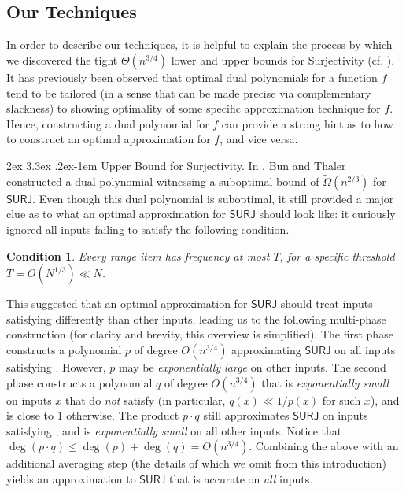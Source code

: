 \documentclass[11pt, letterpaper, fleqn]{article}
\makeatletter
\newcommand{\para}{
  \@startsection{paragraph}{4}
  {\z@}{2ex \@plus 3.3ex \@minus .2ex}{-1em}
  {\normalfont\normalsize\bfseries}
}
\newtheorem{condition}{Condition}
\theoremstyle{plain}
\makeatother
\begin{document}
 

\subsection{Our Techniques}
\label{s:overview}
In order to describe our techniques, it is helpful to explain the process
by which we discovered the tight $\tilde{\Theta}(n^{3/4})$ 
lower and upper bounds for Surjectivity (cf. ).
It has previously been observed \cite{thaler, bt13, adegsurj} that 
optimal dual polynomials for a function $f$
tend to be tailored (in a sense that can be made precise via complementary slackness)
to showing optimality of some specific approximation technique for $f$. Hence, 
constructing a
dual polynomial for $f$ can provide a strong hint as to how to construct an optimal approximation for $f$,
and vice versa.

\para{Upper Bound for Surjectivity.}
In \cite{adegsurj}, Bun and Thaler  constructed a dual polynomial 
witnessing a suboptimal bound of $\tilde{\Omega}(n^{2/3})$ for $\mathsf{SURJ}$. Even though
this dual polynomial is suboptimal, it still provided a major clue as to what an optimal 
approximation for $\mathsf{SURJ}$ should look like: 
 it curiously
 ignored all inputs failing to satisfy the following condition.
\begin{condition} \label{cond}
Every range item has frequency at most $T$, for a specific threshold $T=O(N^{1/3}) \ll N$.
\end{condition}
\noindent This 
suggested that an optimal approximation for $\mathsf{SURJ}$ should treat inputs satisfying    differently than other inputs,
leading us to the following multi-phase construction (for clarity and brevity,
this overview is simplified).
The first phase constructs a polynomial $p$ of degree $O(n^{3/4})$
approximating $\mathsf{SURJ}$ on all inputs satisfying . However, $p$
may be \emph{exponentially large} on other inputs. 
The second phase constructs a polynomial $q$ of degree $O(n^{3/4})$ that is \emph{exponentially small} on inputs $x$ that 
do \emph{not} satisfy  (in particular, $q(x) \ll 1/p(x)$ for such $x$), and is close to 1 otherwise. The product $p \cdot q$ still
approximates $\mathsf{SURJ}$ on inputs satisfying ,
and is \emph{exponentially small} on all other inputs. Notice that 
 $\deg(p \cdot q) \leq \deg(p) + \deg(q) = O(n^{3/4})$.
Combining the above with an additional averaging step (the details of which we omit from this introduction)
yields an approximation to $\mathsf{SURJ}$  that is accurate on \emph{all} inputs. 
\end{document}
